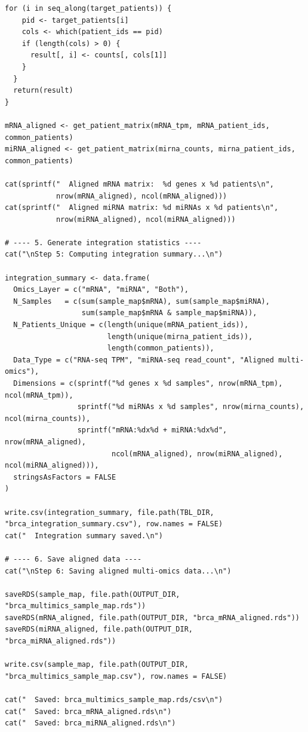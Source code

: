 \documentclass[12pt,a4paper]{ctexart}
\begin{document}
\begin{lstlisting}[caption={03_integrate_omics}, basicstyle=\ttfamily\scriptsize]
  for (i in seq_along(target_patients)) {
    pid <- target_patients[i]
    cols <- which(patient_ids == pid)
    if (length(cols) > 0) {
      result[, i] <- counts[, cols[1]]
    }
  }
  return(result)
}

mRNA_aligned <- get_patient_matrix(mRNA_tpm, mRNA_patient_ids, common_patients)
miRNA_aligned <- get_patient_matrix(mirna_counts, mirna_patient_ids, common_patients)

cat(sprintf("  Aligned mRNA matrix:  %d genes x %d patients\n",
            nrow(mRNA_aligned), ncol(mRNA_aligned)))
cat(sprintf("  Aligned miRNA matrix: %d miRNAs x %d patients\n",
            nrow(miRNA_aligned), ncol(miRNA_aligned)))

# ---- 5. Generate integration statistics ----
cat("\nStep 5: Computing integration summary...\n")

integration_summary <- data.frame(
  Omics_Layer = c("mRNA", "miRNA", "Both"),
  N_Samples   = c(sum(sample_map$mRNA), sum(sample_map$miRNA),
                  sum(sample_map$mRNA & sample_map$miRNA)),
  N_Patients_Unique = c(length(unique(mRNA_patient_ids)),
                        length(unique(mirna_patient_ids)),
                        length(common_patients)),
  Data_Type = c("RNA-seq TPM", "miRNA-seq read_count", "Aligned multi-omics"),
  Dimensions = c(sprintf("%d genes x %d samples", nrow(mRNA_tpm), ncol(mRNA_tpm)),
                 sprintf("%d miRNAs x %d samples", nrow(mirna_counts), ncol(mirna_counts)),
                 sprintf("mRNA:%dx%d + miRNA:%dx%d", nrow(mRNA_aligned),
                         ncol(mRNA_aligned), nrow(miRNA_aligned), ncol(miRNA_aligned))),
  stringsAsFactors = FALSE
)

write.csv(integration_summary, file.path(TBL_DIR, "brca_integration_summary.csv"), row.names = FALSE)
cat("  Integration summary saved.\n")

# ---- 6. Save aligned data ----
cat("\nStep 6: Saving aligned multi-omics data...\n")

saveRDS(sample_map, file.path(OUTPUT_DIR, "brca_multimics_sample_map.rds"))
saveRDS(mRNA_aligned, file.path(OUTPUT_DIR, "brca_mRNA_aligned.rds"))
saveRDS(miRNA_aligned, file.path(OUTPUT_DIR, "brca_miRNA_aligned.rds"))

write.csv(sample_map, file.path(OUTPUT_DIR, "brca_multimics_sample_map.csv"), row.names = FALSE)

cat("  Saved: brca_multimics_sample_map.rds/csv\n")
cat("  Saved: brca_mRNA_aligned.rds\n")
cat("  Saved: brca_miRNA_aligned.rds\n")


\end{lstlisting}
\end{document}
